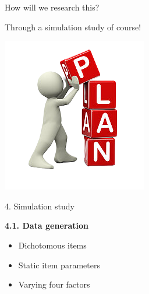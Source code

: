 \documentclass[aspectratio=169]{beamer}
\begin{document}
\begin{frame}{How will we research this?}

\begin{center}
Through a simulation study of course!

\includegraphics[width = 3.5 cm, height = 4 cm]{images/plan.png}

\end{center}

\end{frame}

\begin{frame}{4. Simulation study}

\begin{block}{\textbf{4.1. Data generation}}
\begin{itemize}
	\item{Dichotomous items}
	\item{Static item parameters}
	\item{Varying four factors}
\end{itemize}

\end{block}

\end{frame}
\end{document}
